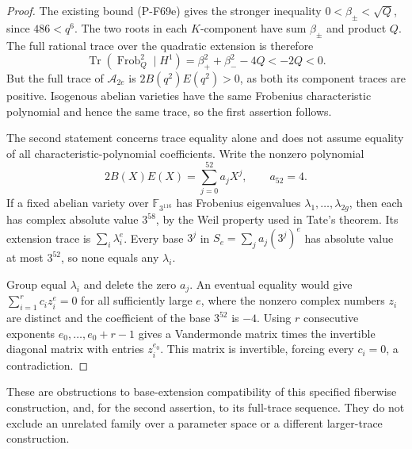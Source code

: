 \begin{proof}
The existing bound (P-F69e) gives the stronger inequality
$0<\beta_\pm<\sqrt Q$, since $486<q^6$.  The two roots
in each $K$-component have sum $\beta_\pm$ and product
$Q$.  The full rational trace over the quadratic extension
is therefore
\[
 \operatorname{Tr}(\operatorname{Frob}_Q^2\mid H^1)
       =\beta_+^2+\beta_-^2-4Q<-2Q<0.                          \tag{P-F69i}
\]
But the full trace of $\mathcal A_{2e}$ is
$2B(q^2)E(q^2)>0$, as both its component traces are
positive.  Isogenous abelian varieties have the same
Frobenius characteristic polynomial and hence the same
trace, so the first assertion follows.

The second statement concerns trace equality alone and
does not assume equality of all characteristic-polynomial
coefficients.  Write the nonzero polynomial
\[
                 2B(X)E(X)=\sum_{j=0}^{52}a_jX^j,
                 \qquad a_{52}=4.
\]
If a fixed abelian variety over $\mathbb F_{3^{116}}$
has Frobenius eigenvalues $\lambda_1,\ldots,\lambda_{2g}$,
then each has complex absolute value $3^{58}$, by the
Weil property used in Tate's theorem.  Its extension
trace is $\sum_i\lambda_i^e$.  Every base $3^j$ in
$S_e=\sum_j a_j(3^j)^e$ has absolute value at most
$3^{52}$, so none equals any $\lambda_i$.

Group equal $\lambda_i$ and delete the zero $a_j$.
An eventual equality would give
$\sum_{i=1}^r c_i z_i^e=0$ for all sufficiently large $e$,
where the nonzero complex numbers $z_i$ are distinct
and the coefficient of the base $3^{52}$ is $-4$.
Using $r$ consecutive exponents $e_0,\ldots,e_0+r-1$
gives a Vandermonde matrix times the invertible diagonal
matrix with entries $z_i^{e_0}$.  This matrix is invertible,
forcing every $c_i=0$, a contradiction.
\end{proof}

These are obstructions to base-extension compatibility of
this specified fiberwise construction, and, for the second
assertion, to its full-trace sequence.  They do not exclude
an unrelated family over a parameter space or a different
larger-trace construction.
